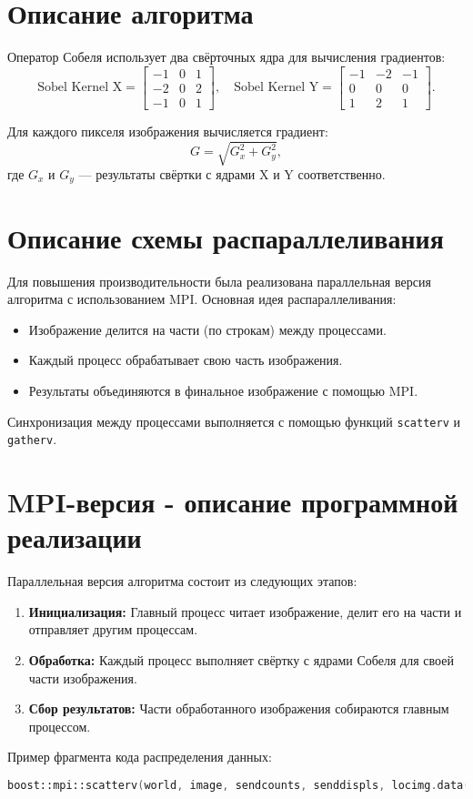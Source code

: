 \documentclass[12pt]{article}
\begin{document}
\newpage
\section*{Описание алгоритма}
Оператор Собеля использует два свёрточных ядра для вычисления градиентов:
\begin{equation}
\text{Sobel Kernel X} = \begin{bmatrix}
-1 & 0 & 1 \\
-2 & 0 & 2 \\
-1 & 0 & 1
\end{bmatrix}, \quad
\text{Sobel Kernel Y} = \begin{bmatrix}
-1 & -2 & -1 \\
 0 &  0 &  0 \\
 1 &  2 &  1
\end{bmatrix}.
\end{equation}

Для каждого пикселя изображения вычисляется градиент:
\begin{equation}
G = \sqrt{G_x^2 + G_y^2},
\end{equation}
где $G_x$ и $G_y$ — результаты свёртки с ядрами X и Y соответственно.

\newpage
\section*{Описание схемы распараллеливания}
Для повышения производительности была реализована параллельная версия алгоритма с использованием MPI. Основная идея распараллеливания:
\begin{itemize}
    \item Изображение делится на части (по строкам) между процессами.
    \item Каждый процесс обрабатывает свою часть изображения.
    \item Результаты объединяются в финальное изображение с помощью MPI.
\end{itemize}
Синхронизация между процессами выполняется с помощью функций \texttt{scatterv} и \texttt{gatherv}.

\newpage
\section*{MPI-версия - описание программной реализации}
Параллельная версия алгоритма состоит из следующих этапов:
\begin{enumerate}
    \item \textbf{Инициализация:} Главный процесс читает изображение, делит его на части и отправляет другим процессам.
    \item \textbf{Обработка:} Каждый процесс выполняет свёртку с ядрами Собеля для своей части изображения.
    \item \textbf{Сбор результатов:} Части обработанного изображения собираются главным процессом.
\end{enumerate}
Пример фрагмента кода распределения данных:
\begin{lstlisting}[language=C++,caption={Распределение данных между процессами}]
boost::mpi::scatterv(world, image, sendcounts, senddispls, locimg.data(), locimg.size(), 0);
\end{lstlisting}
\end{document}
